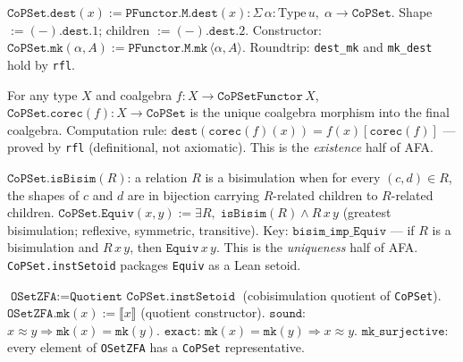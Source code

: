 \begin{definition}
\label{def:CoPSet_ops}
\leanok
{}
$\texttt{CoPSet.dest}(x) := \texttt{PFunctor.M.dest}(x) : \Sigma\,\alpha :
\mathrm{Type}\,u,\; \alpha \to \texttt{CoPSet}$.
Shape $:= (-).\texttt{dest}.1$; children $:= (-).\texttt{dest}.2$.
Constructor: $\texttt{CoPSet.mk}(\alpha, A) :=
\texttt{PFunctor.M.mk}\,\langle\alpha, A\rangle$.
Roundtrip: \texttt{dest\_mk} and \texttt{mk\_dest} hold by \texttt{rfl}.
\end{definition}

\begin{definition}[Corecursor]
\label{def:CoPSet_corec}
\leanok
{}
For any type $X$ and coalgebra $f : X \to \texttt{CoPSetFunctor}\,X$,
$\texttt{CoPSet.corec}(f) : X \to \texttt{CoPSet}$ is the unique
coalgebra morphism into the final coalgebra.
Computation rule: $\texttt{dest}(\texttt{corec}(f)(x)) =
f(x)[\texttt{corec}(f)]$ --- proved by \texttt{rfl} (definitional, not
axiomatic).
This is the \emph{existence} half of AFA.
\end{definition}

\begin{definition}
\label{def:CoPSet_equiv}
\leanok
{}
$\texttt{CoPSet.isBisim}(R)$: a relation $R$ is a bisimulation when
for every $(c, d) \in R$, the shapes of $c$ and $d$ are in bijection
carrying $R$-related children to $R$-related children.
$\texttt{CoPSet.Equiv}(x, y) := \exists R,\; \texttt{isBisim}(R) \land R\,x\,y$
(greatest bisimulation; reflexive, symmetric, transitive).
Key: $\texttt{bisim\_imp\_Equiv}$ --- if $R$ is a bisimulation and $R\,x\,y$,
then $\texttt{Equiv}\,x\,y$.  This is the \emph{uniqueness} half of AFA.
\texttt{CoPSet.instSetoid} packages \texttt{Equiv} as a Lean setoid.
\end{definition}

\begin{definition}
\label{def:OSetZFA}
\leanok
{}
$\texttt{OSetZFA} := \texttt{Quotient CoPSet.instSetoid}$ (cobisimulation
quotient of \texttt{CoPSet}).
$\texttt{OSetZFA.mk}(x) := \llbracket x \rrbracket$ (quotient constructor).
$\texttt{sound}$: $x \approx y \Rightarrow \texttt{mk}(x) = \texttt{mk}(y)$.
$\texttt{exact}$: $\texttt{mk}(x) = \texttt{mk}(y) \Rightarrow x \approx y$.
$\texttt{mk\_surjective}$: every element of \texttt{OSetZFA} has a
\texttt{CoPSet} representative.
\end{definition}

